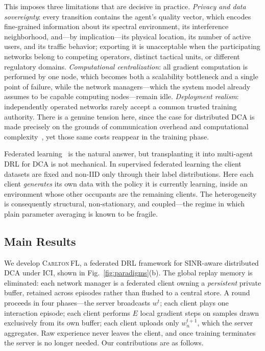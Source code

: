 \documentclass[journal]{IEEEtran}
\newcommand{\OURS}{\textsc{Carlton\,FL}}
\begin{document}
This imposes three limitations that are decisive in practice. \emph{Privacy and
data sovereignty}: every transition contains the agent's quality vector, which
encodes fine-grained information about its spectral environment, its
interference neighborhood, and---by implication---its physical location, its
number of active users, and its traffic behavior; exporting it is unacceptable
when the participating networks belong to competing operators, distinct
tactical units, or different regulatory domains. \emph{Computational
centralization}: all gradient computation is performed by one node, which
becomes both a scalability bottleneck and a single point of failure, while the
network managers---which the system model already assumes to be capable
computing nodes---remain idle. \emph{Deployment realism}: independently
operated networks rarely accept a common trusted training authority. There is a
genuine tension here, since the case for distributed DCA is made precisely on
the grounds of communication overhead and computational
complexity~\cite{cohen2024carlton}, yet those same costs reappear in the
training phase.

Federated learning~\cite{mcmahan2017fedavg,kairouz2021advances} is the natural
answer, but transplanting it into multi-agent DRL for DCA is not mechanical.
In supervised federated learning the client datasets are fixed and non-IID only
through their label distributions. Here each client \emph{generates} its own
data with the policy it is currently learning, inside an environment whose
other occupants are the remaining clients. The heterogeneity is consequently
structural, non-stationary, and coupled---the regime in which plain parameter
averaging is known to be fragile.

\subsection{Main Results}
\label{subsec:intro_main}

We develop \OURS{}, a federated DRL framework for SINR-aware distributed DCA
under ICI, shown in Fig.~\ref{fig:paradigms}(b). The global replay memory is
eliminated: each network manager is a federated client owning a
\emph{persistent} private buffer, retained across episodes rather than flushed
to a central store. A round proceeds in four phases---the server broadcasts
$w^{t}$; each client plays one interaction episode; each client performs $E$
local gradient steps on samples drawn exclusively from its own buffer; each
client uploads only $w^{t+1}_{n}$, which the server aggregates. Raw experience
never leaves the client, and once training terminates the server is no longer
needed. Our contributions are as follows.
\end{document}
